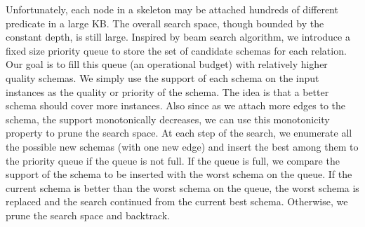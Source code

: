 Unfortunately, each node in a skeleton may be attached hundreds of
different predicate in a large KB. The overall search space, though
bounded by the constant depth, is still large.
Inspired by beam search algorithm\cite{ney1992data}, we introduce a fixed size 
priority queue to store the set of candidate schemas for each relation.
Our goal is to fill this queue (an operational budget) 
with relatively higher quality
schemas. We simply use the support of each schema on the input instances
as the quality or priority of the schema. The idea is that a better schema
should cover more instances. Also since as we attach more edges to the schema,
the support monotonically decreases, we can use this 
monotonicity property to prune the search
space. At each step of the search, we enumerate all the possible new schemas
(with one new edge) and insert the best among them to the priority queue if the
queue is not full. If the queue is full, we compare the support of the 
schema to be inserted with the worst schema on the queue. 
If the current schema is better than the worst schema on the queue, 
the worst schema is replaced and
the search continued from the current best schema. 
Otherwise, we prune the search space and backtrack.

%

